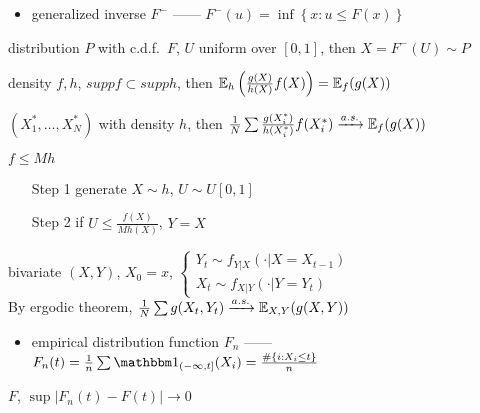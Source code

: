 \begin{itemize}
    \item generalized inverse $F^-$ ------ $F^-(u) = \inf \left\{ x : u \leq F(x) \right\}$
\end{itemize}

\begin{prop}
    distribution $P$ with c.d.f.\ $F$, $U$ uniform over $[0, 1]$, then $X = F^-(U) \sim P$
\end{prop}

\begin{example}
    density $f, h$, $supp f \subset supp h$, then $\mathbb{E}_h\left( \frac{g(X)}{h(X)}f(X) \right) = \mathbb{E}_f(g(X))$
    \begin{fact}
        $(X_1^*,\dots, X_N^*)$ with density $h$, then $\frac{1}{N}\sum \frac{g(X^*_i)}{h(X_i^*)}f(X_i^*) \xrightarrow{a.s.} \mathbb{E}_f(g(X))$
    \end{fact}
\end{example}

\begin{example}
    $f \leq Mh$
    \begin{enumerate}
        \item[Step 1] generate $X \sim h$, $U \sim U[0,1]$
        \item[Step 2] if $U \leq \frac{f(X)}{Mh(X)}$, $Y = X$
    \end{enumerate}
\end{example}

\begin{example}
    bivariate $(X, Y)$, $X_0 = x$, $\begin{cases}
                                        Y_t \sim f_{Y|X}(\cdot|X = X_{t-1})\\
                                        X_t \sim f_{X|Y}(\cdot|Y = Y_t)
    \end{cases}$\\
    By ergodic theorem, $\frac{1}{N}\sum g(X_t, Y_t) \xrightarrow{a.s.} \mathbb{E}_{X,Y}(g(X,Y))$
\end{example}

\begin{itemize}
    \item empirical distribution function $F_n$ ------ $F_n(t) = \frac{1}{n}\sum \In_{(-\infty, t]}(X_i) = \frac{\# \left\{ i : X_i \leq t \right\}}{n}$
\end{itemize}

\begin{thm}
    $F$, $\sup |F_n(t) - F(t)| \rightarrow 0$
\end{thm}

